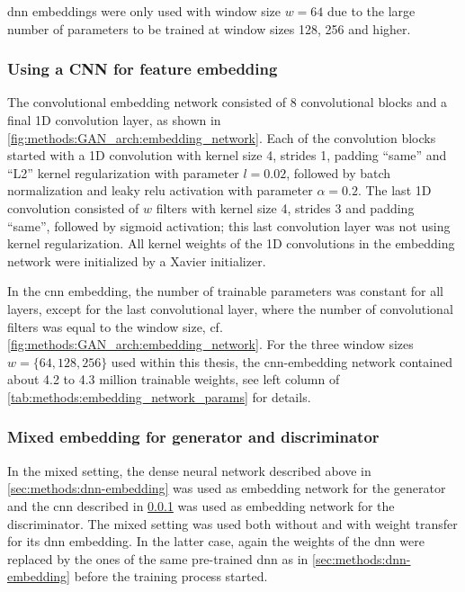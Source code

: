 \acrshort{dnn} embeddings were only used with window size $w=64$ due to the large number of parameters
to be trained at window sizes 128, 256 and higher.

\subsubsection{Using a CNN for feature embedding} \label{sec:methods:cnn-embedding}
The convolutional embedding network consisted of 8 convolutional blocks and a final 1D convolution layer, 
as shown in \cref{fig:methods:GAN_arch:embedding_network}.
Each of the convolution blocks started with a 1D convolution with kernel size 4, strides 1, padding ``same'' 
and ``L2'' kernel regularization with parameter $l=0.02$, followed by batch normalization and leaky \acrshort{relu} activation
with parameter $\alpha=0.2$. 
The last 1D convolution consisted of $w$ filters with kernel size 4, strides 3 and padding ``same'',
followed by sigmoid activation; this last convolution layer was not using kernel regularization.
All kernel weights of the 1D convolutions in the embedding network were initialized by a Xavier initializer.

In the \acrshort{cnn} embedding, the number of trainable parameters was constant for all layers, except for the last convolutional layer, where the number
of convolutional filters was equal to the window size, cf. \cref{fig:methods:GAN_arch:embedding_network}. 
For the three window sizes $w=\{64,128,256\}$ used within this thesis, the \acrshort{cnn}-embedding network 
contained about 4.2 to 4.3 million trainable weights, see left column of \cref{tab:methods:embedding_network_params} for details.

\subsubsection{Mixed embedding for generator and discriminator} \label{sec:methods:mixed-embedding}
In the mixed setting, the dense neural network described above in \cref{sec:methods:dnn-embedding} was used as  
embedding network for the generator and the \acrshort{cnn} described in \cref{sec:methods:cnn-embedding} was used as embedding
network for the discriminator.
The mixed setting was used both without and with weight transfer for its \acrshort{dnn} embedding.
In the latter case, again the weights of the \acrshort{dnn} were replaced by the ones of the same pre-trained \acrshort{dnn} as in \cref{sec:methods:dnn-embedding}
 before the training process started.
 
